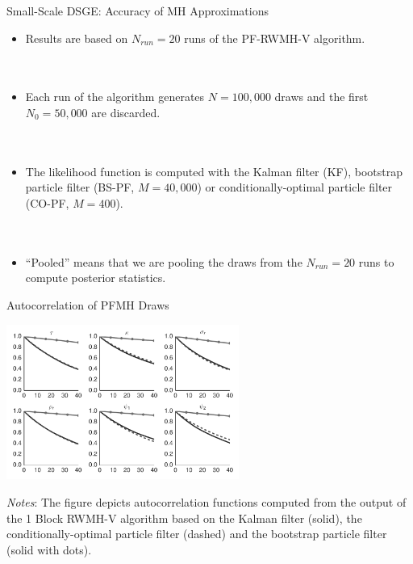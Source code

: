 \documentclass[presentation]{beamer}
\begin{document}
\begin{frame}[label={sec:org449e1aa}]{Small-Scale DSGE: Accuracy of MH Approximations}
\begin{itemize}
\item Results are based on \(N_{run}=20\) runs of the PF-RWMH-V algorithm.
\\~\\~
\item Each run of the algorithm generates \(N=100,000\) draws and the first \(N_0=50,000\) are discarded.
\\~\\~
\item The likelihood function is computed with the Kalman filter (KF), bootstrap particle filter (BS-PF, \(M=40,000\)) or conditionally-optimal particle filter (CO-PF, \(M=400\)).
\\~\\~
\item ``Pooled'' means that we are pooling the draws from the \(N_{run}=20\) runs to compute posterior statistics.
\end{itemize}
\end{frame}

\begin{frame}[label={sec:org7b9b1d0}]{Autocorrelation of PFMH Draws}
\begin{center}
	\includegraphics[width=3in]{dsge1_me_pmcmc_acf.pdf}
\end{center}
\emph{Notes}: The figure depicts autocorrelation functions computed from the
output of the 1 Block RWMH-V algorithm based on the Kalman filter (solid), the conditionally-optimal
particle filter (dashed) and the bootstrap particle filter (solid with dots).
\end{frame}
\end{document}
